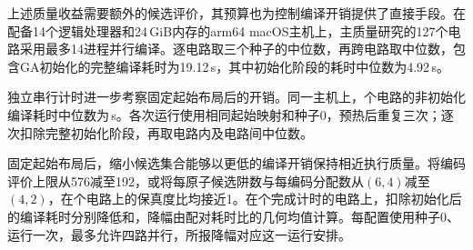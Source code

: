 上述质量收益需要额外的候选评价，其预算也为控制编译开销提供了直接手段。在配备14个逻辑处理器和24\,GiB内存的arm64 macOS主机上，主质量研究的127个电路采用最多14进程并行编译。逐电路取三个种子的中位数，再跨电路取中位数，包含GA初始化的完整编译耗时为19.12\,s，其中初始化阶段的耗时中位数为4.92\,s。

独立串行计时进一步考察固定起始布局后的开销。同一主机上，\GAMainFixedLayoutCircuitN 个电路的非初始化编译耗时中位数为\GAMainPostInitialMedianSeconds\,s。各次运行使用相同起始映射和种子0，预热后重复三次；逐次扣除完整初始化阶段，再取电路内及电路间中位数。

固定起始布局后，缩小候选集合能够以更低的编译开销保持相近执行质量。将编码评价上限从576减至192，或将每原子候选阱数与每编码分配数从$(6,4)$减至$(4,2)$，在\SensitivityFidelityN 个电路上的保真度比均接近1。在\GAMainBudgetTimingN 个完成计时的电路上，扣除初始化后的编译耗时分别降低和，降幅由配对耗时比的几何均值计算。每配置使用种子0、运行一次，最多允许四路并行，所报降幅对应这一运行安排。
